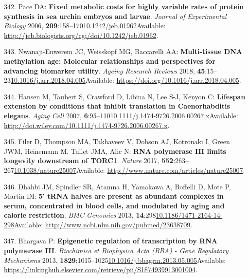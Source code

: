\documentclass[
]{book}
\begin{document}
\leavevmode\hypertarget{ref-Pace2006}{}%
342. Pace DA: \textbf{Fixed metabolic costs for highly variable rates of protein synthesis in sea urchin embryos and larvae}. \emph{Journal of Experimental Biology} 2006, \textbf{209}:158--170\href{https://doi.org/10.1242/jeb.01962}{10.1242/jeb.01962}Available: \url{http://jeb.biologists.org/cgi/doi/10.1242/jeb.01962}.

\leavevmode\hypertarget{ref-Nwanaji-Enwerem2018}{}%
343. Nwanaji-Enwerem JC, Weisskopf MG, Baccarelli AA: \textbf{Multi-tissue DNA methylation age: Molecular relationships and perspectives for advancing biomarker utility}. \emph{Ageing Research Reviews} 2018, \textbf{45}:15--23\href{https://doi.org/10.1016/j.arr.2018.04.005}{10.1016/j.arr.2018.04.005}Available: \url{https://doi.org/10.1016/j.arr.2018.04.005}.

\leavevmode\hypertarget{ref-Hansen2007}{}%
344. Hansen M, Taubert S, Crawford D, Libina N, Lee S-J, Kenyon C: \textbf{Lifespan extension by conditions that inhibit translation in Caenorhabditis elegans}. \emph{Aging Cell} 2007, \textbf{6}:95--110\href{https://doi.org/10.1111/j.1474-9726.2006.00267.x}{10.1111/j.1474-9726.2006.00267.x}Available: \url{http://doi.wiley.com/10.1111/j.1474-9726.2006.00267.x}.

\leavevmode\hypertarget{ref-Filer2017}{}%
345. Filer D, Thompson MA, Takhaveev V, Dobson AJ, Kotronaki I, Green JWM, Heinemann M, Tullet JMA, Alic N: \textbf{RNA polymerase III limits longevity downstream of TORC1}. \emph{Nature} 2017, \textbf{552}:263--267\href{https://doi.org/10.1038/nature25007}{10.1038/nature25007}Available: \url{http://www.nature.com/articles/nature25007}.

\leavevmode\hypertarget{ref-Dhahbi2013}{}%
346. Dhahbi JM, Spindler SR, Atamna H, Yamakawa A, Boffelli D, Mote P, Martin DI: \textbf{5' tRNA halves are present as abundant complexes in serum, concentrated in blood cells, and modulated by aging and calorie restriction}. \emph{BMC Genomics} 2013, \textbf{14}:298\href{https://doi.org/10.1186/1471-2164-14-298}{10.1186/1471-2164-14-298}Available: \url{http://www.ncbi.nlm.nih.gov/pubmed/23638709}.

\leavevmode\hypertarget{ref-Bhargava2013a}{}%
347. Bhargava P: \textbf{Epigenetic regulation of transcription by RNA polymerase III}. \emph{Biochimica et Biophysica Acta (BBA) - Gene Regulatory Mechanisms} 2013, \textbf{1829}:1015--1025\href{https://doi.org/10.1016/j.bbagrm.2013.05.005}{10.1016/j.bbagrm.2013.05.005}Available: \url{https://linkinghub.elsevier.com/retrieve/pii/S1874939913001004}.
\end{document}
